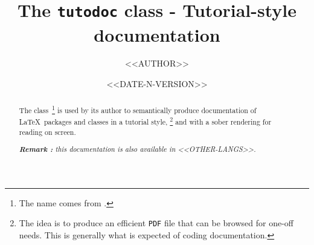 \documentclass[10pt, a4paper]{article}
\begin{document}
\title{The \texttt{tutodoc} class - Tutorial-style documentation}
\author{<<AUTHOR>>}
\date{<<DATE-N-VERSION>>}

\maketitle

\begin{abstract}
    The \thisproj{} class\,%
    \footnote{
        The name comes from .
    }
    is used by its author to semantically produce documentation of \LaTeX\ packages and classes in a tutorial style,%
    \footnote{
        The idea is to produce an efficient \texttt{PDF} file that can be browsed for one-off needs. This is generally what is expected of coding documentation.
    }
    and with a sober rendering for reading on screen.

    \smallskip

	\noindent
    \emph{\textbf{Remark :} this documentation is also available in <<OTHER-LANGS>>.}
\end{abstract}
\end{document}
